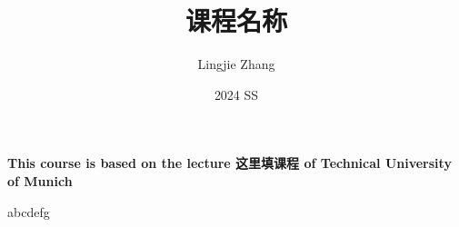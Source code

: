 \documentclass[12pt, a4paper, oneside, justified]{article}
\title{课程名称}
\author{Lingjie Zhang}
\date{2024 SS}
\begin{document}
\maketitle

\begin{center}
    \textbf{This course is based on the lecture 这里填课程 of Technical University of Munich}
\end{center}

\tableofcontents
\newpage
{}


abcdefg
\end{document}
